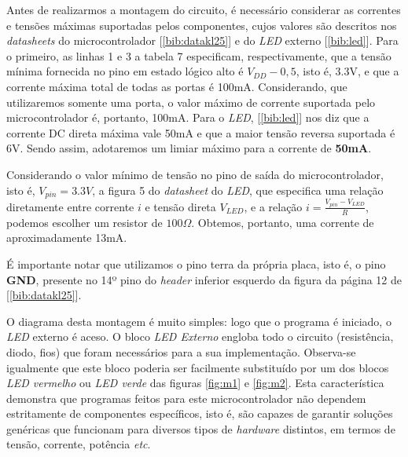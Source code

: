\vspace{12pt}

Antes de realizarmos a montagem do circuito, é necessário considerar as
correntes e tensões máximas suportadas pelos componentes, cujos valores
são descritos nos \textit{datasheets} do microcontrolador
[\ref{bib:datakl25}] e do \textit{LED} externo [\ref{bib:led}]. Para o primeiro,
as linhas 1 e 3 a tabela 7 especificam, respectivamente, que a tensão mínima
fornecida no pino em estado lógico alto é \(V_{DD} - 0,5\), isto é, 3.3V, e que
a corrente máxima total de todas as portas é 100mA. Considerando, que
utilizaremos somente uma porta, o valor máximo de corrente suportada pelo
microcontrolador é, portanto, 100mA. Para o \textit{LED}, [\ref{bib:led}] nos
diz que a corrente DC direta máxima vale 50mA e que a maior tensão reversa
suportada é 6V. Sendo assim, adotaremos um limiar máximo para a corrente de
\textbf{50mA}.

\vspace{12pt}

Considerando o valor mínimo de tensão no pino de saída do microcontrolador, isto
é, \(V_{pin}=3.3V\), a figura 5 do \textit{datasheet} do \textit{LED}, que
especifica uma relação diretamente entre corrente \(i\) e tensão direta
\(V_{LED}\), e a relação \(i=\frac{V_{pin} - V_{LED}}{R}\), podemos escolher um
resistor de \(100\Omega\). Obtemos, portanto, uma corrente de aproximadamente
13mA. 

\vspace{12pt}

É importante notar que utilizamos o pino terra da própria placa, isto é, o
pino \textbf{GND}, presente no 14º pino do \textit{header} inferior esquerdo da
figura da página 12 de [\ref{bib:datakl25}].

\vspace{12pt}

O diagrama desta montagem é muito simples: logo que o programa é iniciado, o
\textit{LED} externo é aceso. O bloco \textit{LED Externo} engloba todo o
circuito (resistência, diodo, fios) que foram necessários para a sua
implementação. Observa-se igualmente que este bloco poderia ser facilmente
substituído por um dos blocos \textit{LED vermelho} ou \textit{LED verde} das
figuras \ref{fig:m1} e \ref{fig:m2}. Esta característica demonstra que programas
feitos para este microcontrolador não dependem estritamente de componentes
específicos, isto é, são capazes de garantir soluções genéricas que funcionam
para diversos tipos de \textit{hardware} distintos, em termos de tensão,
corrente, potência \textit{etc}.

